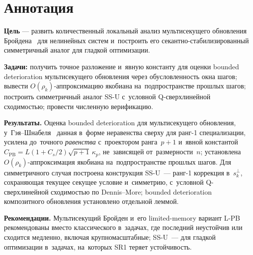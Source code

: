 
\chapter*{Аннотация}

\noindent
\textbf{Цель} --- развить количественный локальный анализ
мультисекущего обновления Бройдена~\cite{schnabel1983} для нелинейных
систем и~построить его секантно-стабилизированный симметричный аналог
для гладкой оптимизации.

\noindent
\textbf{Задачи:} получить точное разложение и~явную константу для оценки bounded deterioration мультисекущего обновления через обусловленность окна шагов; вывести $O(\rho_k)$-аппроксимацию якобиана на~подпространстве прошлых шагов; построить симметричный аналог SS-U с~условной Q-сверхлинейной сходимостью; провести численную верификацию.

\noindent
\textbf{Результаты.} Оценка bounded deterioration для мультисекущего
обновления, у~Гэя--Шнабеля~\cite{gay_schnabel1978} данная в~форме
неравенства сверху для ранг-1 специализации, усилена до~точного
\emph{равенства} с~проектором ранга~$p{+}1$ и~явной константой
$C_{\mathrm{PB}} = L(1{+}C_s/2)\sqrt{p+1}\,\kappa_p$, не~зависящей
от~размерности~$n$; установлена $O(\rho_k)$-аппроксимация якобиана
на~подпространстве прошлых шагов. Для симметричного случая построена
конструкция SS-U~--- ранг-1 коррекция в~$s_k^{\perp}$, сохраняющая
текущее секущее условие и~симметрию, с~условной Q-сверхлинейной
сходимостью по Dennis--More; bounded deterioration композитного
обновления установлено отдельной леммой.

\noindent
\textbf{Рекомендации.} Мультисекущий Бройден и~его limited-memory
вариант L-PB рекомендованы вместо классического в~задачах, где
последний неустойчив или сходится медленно, включая крупномасштабные;
SS-U~--- для гладкой оптимизации в~задачах, на~которых SR1 теряет
устойчивость.
